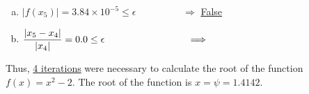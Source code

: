 \begin{list}{\bf Example :~}{}
\begin{description}
\begin{list}{{\bf Iteration } (k=):~}{}
\begin{enumerate}[(a)]
                         \item $\left|f\left(x_{5}\right)\right| = 3.84\times 10^{-5} \leq \epsilon \hspace{2cm} \Longrightarrow$ \underline{False}
                         \item $\frc{\left|x_{5}-x_{4}\right|}{\left|x_{4}\right|} = 0.0 \leq \epsilon \hspace{3cm} \Longrightarrow$ 
                    \end{enumerate}
         \end{list}
         Thus, \underline{4 iterations} were necessary to calculate the root of the function $f(x)=x^{2}-2$. The root of the function is \underline{$x=\psi=1.4142$}.
       \end{description}
         

\end{list}

